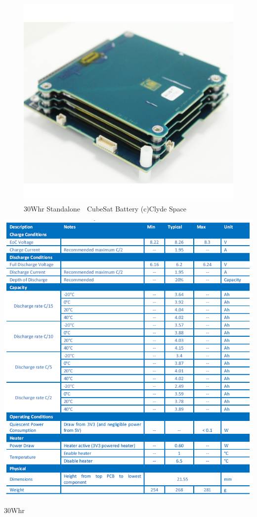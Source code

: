 \begin{figure}[htbp]
	\begin{center}
		\includegraphics[width=0.5\linewidth]{./03/fig/battery.jpg}
		\caption{30Whr Standalone　CubeSat Battery (c)Clyde Space}
		\label{fig3_1_bat}
	\end{center}
\end{figure}

\begin{table}[htbp]
	\begin{center}
		\includegraphics[width=0.8\linewidth]{./03/fig/battery_spec.png}
		\caption{30Whr}
		\label{table3_1_bat_spec}
	\end{center}
\end{table}


